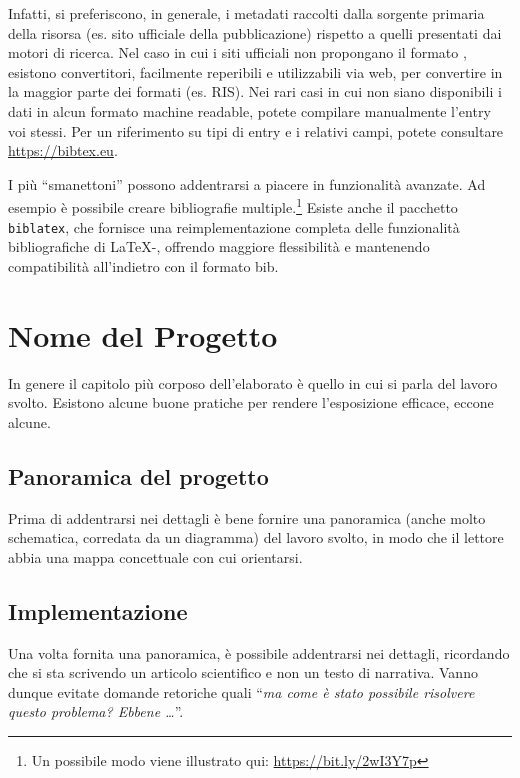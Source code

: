 \documentclass[12pt]{report}
\begin{document}
Infatti, si preferiscono, in generale, i metadati raccolti dalla sorgente primaria della risorsa (es. sito ufficiale della pubblicazione) rispetto a quelli presentati dai motori di ricerca. Nel caso in cui i siti ufficiali non propongano il formato , esistono convertitori, facilmente reperibili e utilizzabili via web, per convertire in  la maggior parte dei formati (es. RIS). Nei rari casi in cui non siano disponibili i dati in alcun formato machine readable, potete compilare manualmente l'entry  voi stessi. Per un riferimento su tipi di entry e i relativi campi, potete consultare \url{https://bibtex.eu}.

I pi\`u ``smanettoni'' possono addentrarsi a piacere in funzionalit\`a avanzate. Ad esempio \`e possibile creare bibliografie multiple.\footnote{Un possibile modo viene illustrato qui: \url{https://bit.ly/2wI3Y7p}}
Esiste anche il pacchetto \texttt{biblatex}, che fornisce una reimplementazione completa delle funzionalit\`a bibliografiche di \LaTeX-, offrendo maggiore flessibilit\`a e mantenendo compatibilit\`a all'indietro con il formato bib.





% 
% 

\chapter{Nome del Progetto}
\label{cap4}

In genere il capitolo più corposo dell'elaborato è quello in cui si parla del lavoro svolto. Esistono alcune buone pratiche per rendere l'esposizione efficace, eccone alcune.

\section{Panoramica del progetto}

Prima di addentrarsi nei dettagli è bene fornire una panoramica (anche molto schematica, corredata da un diagramma) del lavoro svolto, in modo che il lettore abbia una mappa concettuale con cui orientarsi.

\section{Implementazione}

Una volta fornita una panoramica, è possibile addentrarsi nei dettagli, ricordando che si sta scrivendo un articolo scientifico e non un testo di narrativa. Vanno dunque evitate domande retoriche quali ``\textit{ma come è stato possibile risolvere questo problema? Ebbene \ldots}''.
\end{document}
